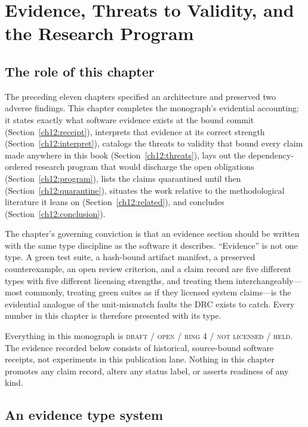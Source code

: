 \chapter{Evidence, Threats to Validity, and the Research Program}\label{ch12:main}

\section{The role of this chapter}\label{ch12:role}

The preceding eleven chapters specified an architecture and preserved two adverse findings. This chapter completes the monograph's evidential accounting: it states exactly what software evidence exists at the bound commit (Section~\ref{ch12:receipt}), interprets that evidence at its correct strength (Section~\ref{ch12:interpret}), catalogs the threats to validity that bound every claim made anywhere in this book (Section~\ref{ch12:threats}), lays out the dependency-ordered research program that would discharge the open obligations (Section~\ref{ch12:program}), lists the claims quarantined until then (Section~\ref{ch12:quarantine}), situates the work relative to the methodological literature it leans on (Section~\ref{ch12:related}), and concludes (Section~\ref{ch12:conclusion}).

The chapter's governing conviction is that an evidence section should be written with the same type discipline as the software it describes. ``Evidence'' is not one type. A green test suite, a hash-bound artifact manifest, a preserved counterexample, an open review criterion, and a claim record are five different types with five different licensing strengths, and treating them interchangeably---most commonly, treating green suites as if they licensed system claims---is the evidential analogue of the unit-mismatch faults the DRC exists to catch. Every number in this chapter is therefore presented with its type.

\begin{boundary}\label{ch12:standing}
Everything in this monograph is \textsc{draft / open / ring 4 / not licensed / held}. The evidence recorded below consists of historical, source-bound software receipts, not experiments in this publication lane. Nothing in this chapter promotes any claim record, alters any status label, or asserts readiness of any kind.
\end{boundary}

\section{An evidence type system}\label{ch12:types}

